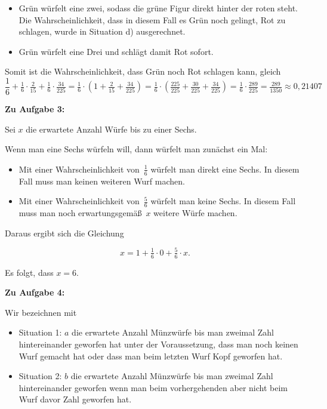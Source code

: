 \documentclass{article}
\begin{document}
\begin{enumerate}
\begin{itemize}
      \item Grün würfelt eine zwei, sodass die grüne Figur direkt hinter der roten steht. Die Wahrscheinlichkeit, dass in diesem Fall es Grün noch gelingt, Rot zu schlagen, wurde in Situation d) ausgerechnet.
      \item Grün würfelt eine Drei und schlägt damit Rot sofort.
    \end{itemize}
    Somit ist die Wahrscheinlichkeit, dass Grün noch Rot schlagen kann, gleich
    \[
      \frac{1}{6} + \tfrac{1}{6} \cdot \tfrac{2}{15} + \tfrac{1}{6} \cdot \tfrac{34}{225} =
      \tfrac{1}{6} \cdot (1 + \tfrac{2}{15} + \tfrac{34}{225}) =
      \tfrac{1}{6} \cdot (\tfrac{225}{225} + \tfrac{30}{225} + \tfrac{34}{225}) =
      \tfrac{1}{6} \cdot \tfrac{289}{225} = \tfrac{289}{1350} \approx 0,21407
    \]
\end{enumerate}

\textbf{Zu Aufgabe 3:}

Sei $x$ die erwartete Anzahl Würfe bis zu einer Sechs.

Wenn man eine Sechs würfeln will, dann würfelt man zunächst ein Mal:

\begin{itemize}
  \item Mit einer Wahrscheinlichkeit von~$\tfrac{1}{6}$ würfelt man direkt eine Sechs. In diesem Fall muss man keinen weiteren Wurf machen.
  \item Mit einer Wahrscheinlichkeit von~$\tfrac{5}{6}$ würfelt man keine Sechs. In diesem Fall muss man noch erwartungsgemäß~$x$ weitere Würfe machen.
\end{itemize}

Daraus ergibt sich die Gleichung

\[ x = 1 + \tfrac{1}{6} \cdot 0 + \tfrac{5}{6} \cdot x. \]

Es folgt, dass $x = 6$.

\textbf{Zu Aufgabe 4:}

Wir bezeichnen mit

\begin{itemize}
  \item Situation 1: $a$ die erwartete Anzahl Münzwürfe bis man zweimal Zahl hintereinander geworfen hat unter der Voraussetzung, dass man noch keinen Wurf gemacht hat oder dass man beim letzten Wurf Kopf geworfen hat.
  \item Situation 2: $b$ die erwartete Anzahl Münzwürfe bis man zweimal Zahl hintereinander geworfen wenn man beim vorhergehenden aber nicht beim Wurf davor Zahl geworfen hat.
\end{itemize}
\end{document}
